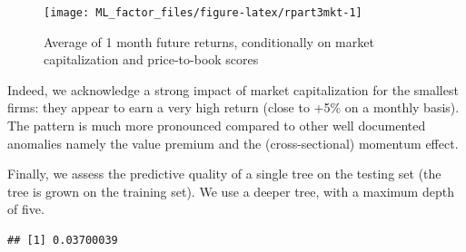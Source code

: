 \documentclass[]{krantz}
\makeatletter
\newenvironment{Shaded}{\begin{snugshade}}{\end{snugshade}}
\newcommand{\CommentTok}[1]{\textcolor[rgb]{0.37,0.37,0.37}{\textit{#1}}}
\newcommand{\DataTypeTok}[1]{\textcolor[rgb]{0.27,0.27,0.27}{#1}}
\newcommand{\DecValTok}[1]{\textcolor[rgb]{0.06,0.06,0.06}{#1}}
\newcommand{\FloatTok}[1]{\textcolor[rgb]{0.06,0.06,0.06}{#1}}
\newcommand{\KeywordTok}[1]{\textcolor[rgb]{0.27,0.27,0.27}{\textbf{#1}}}
\newcommand{\NormalTok}[1]{#1}
\newcommand{\OperatorTok}[1]{\textcolor[rgb]{0.43,0.43,0.43}{\textbf{#1}}}
\newcommand{\StringTok}[1]{\textcolor[rgb]{0.5,0.5,0.5}{#1}}
\newenvironment{kframe}{%
\medskip{}
\setlength{\fboxsep}{.8em}
 \def\at@end@of@kframe{}%
 \ifinner\ifhmode%
  \def\at@end@of@kframe{\end{minipage}}%
  \begin{minipage}{\columnwidth}%
 \fi\fi%
 \def\FrameCommand##1{\hskip\@totalleftmargin \hskip-\fboxsep
 \colorbox{shadecolor}{##1}\hskip-\fboxsep
     \hskip-\linewidth \hskip-\@totalleftmargin \hskip\columnwidth}%
 \MakeFramed {\advance\hsize-\width
   \@totalleftmargin\z@ \linewidth\hsize
   \@setminipage}}%
 {\par\unskip\endMakeFramed%
 \at@end@of@kframe}
\renewenvironment{Shaded}{\begin{kframe}}{\end{kframe}}
\theoremstyle{definition}
\theoremstyle{definition}
\theoremstyle{definition}
\theoremstyle{remark}
\makeatother
\begin{document}
\begin{figure}[b]

{\centering \texttt{[image: ML\_factor\_files/figure-latex/rpart3mkt-1]} 

}

\caption{Average of 1 month future returns, conditionally on market capitalization and price-to-book scores}\label{fig:rpart3mkt}
\end{figure}

\normalsize

Indeed, we acknowledge a strong impact of market capitalization for the
smallest firms: they appear to earn a very high return (close to +5\% on
a monthly basis). The pattern is much more pronounced compared to other
well documented anomalies namely the value premium and the
(cross-sectional) momentum effect.

Finally, we assess the predictive quality of a single tree on the
testing set (the tree is grown on the training set). We use a deeper
tree, with a maximum depth of five.

\footnotesize

\begin{Shaded}
\end{Shaded}

\begin{verbatim}
## [1] 0.03700039
\end{verbatim}

\begin{Shaded}
\end{Shaded}
\end{document}
